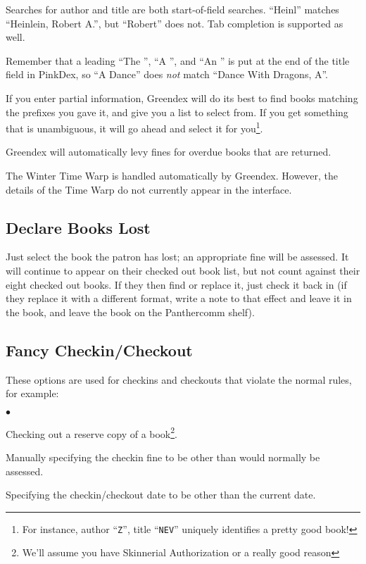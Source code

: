 \documentclass[12pt]{article}
\newenvironment{tightlist}%
{\begin{list}{$\bullet$}{%
    \setlength{\topsep}{0in}
    \setlength{\partopsep}{0in}
    \setlength{\itemsep}{0in}
    \setlength{\parsep}{0em}
    \setlength{\leftmargin}{1.5em}
    \setlength{\rightmargin}{0in}
    \setlength{\itemindent}{0in}
}
}%
{ \end{list} }
\begin{document}
Searches for author and title are both start-of-field searches.
``Heinl'' matches ``Heinlein, Robert A.'', but ``Robert'' does not.  Tab
completion is supported as well.

Remember that a leading ``The '', ``A '', and ``An '' is put at the end of
the title field in PinkDex, so ``A Dance'' does \emph{not} match ``Dance
With Dragons, A''.

If you enter partial information, Greendex will do its best to find books
matching the prefixes you gave it, and give you a list to select from.  If
you get something that is unambiguous, it will go ahead and select it for
you\footnote{For instance, author
  ``\texttt{Z}'', title ``\texttt{NEV}'' uniquely identifies a pretty
  good book!}.

Greendex will automatically levy fines for overdue books that are
returned.

The Winter Time Warp is handled automatically by Greendex.  However, the
details of the Time Warp do not currently appear in the interface.

\subsection{Declare Books Lost}

Just select the book the patron has lost; an appropriate fine will be
assessed.  It will continue to appear on their checked out book list, but
not count against their eight checked out books.  If they then find or
replace it, just check it back in (if they replace it with a different
format, write a note to that effect and leave it in the book, and leave the
book on the Panthercomm shelf).

\subsection{Fancy Checkin/Checkout}

These options are used for checkins and checkouts that violate the
normal rules, for example:
\begin{tightlist}
\item Checking out a reserve copy of a book\footnote{We'll assume you have
  Skinnerial Authorization or a really good reason}.
\item Manually specifying the checkin fine to be other than would
  normally be assessed.
\item Specifying the checkin/checkout date to be other than the current
  date.
\end{tightlist}
\end{document}
